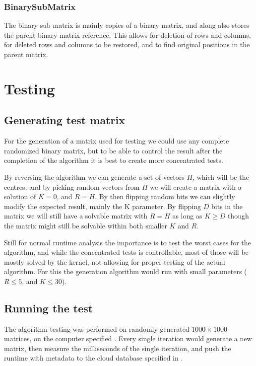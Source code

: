 \documentclass[a4paper]{article}
\begin{document}
\subsubsection{BinarySubMatrix}
The binary sub matrix is mainly copies of a binary matrix, and along also stores the parent
binary matrix reference. This allows for deletion of rows and columns, for deleted rows and
columns to be restored, and to find original positions in the parent matrix.

%
%
\newpage

\section{Testing}
\subsection{Generating test matrix}
For the generation of a matrix used for testing we could use any complete randomized binary
matrix, but to be able to control the result after the completion of the algorithm it is best
to create more concentrated tests.



By reversing the algorithm we can generate a set of vectors $H$, which will be the centres,
and by picking random vectors from $H$ we will create a matrix with a solution of $K=0$,
and $R=H$. By then flipping random bits we can slightly modify the expected result, mainly
the K parameter. By flipping $D$ bits in the matrix we will still have a solvable matrix
with $R = H$ as long as $K \geq D$ though the matrix might still be solvable within both
smaller $K$ and $R$.


Still for normal runtime analysis the importance is to test the worst cases for the algorithm,
and while the concentrated tests is controllable, most of those will be mostly solved by the
kernel, not allowing for proper testing of the actual algorithm. For this the generation
algorithm would run with small parameters ($R \leq 5$, and $K \leq 30$).

\subsection{Running the test}
The algorithm testing was performed on randomly generated $1000 \times 1000$ matrices, on the computer
specified . Every single iteration would generate a new matrix, then measure the
milliseconds of the single iteration, and push the runtime with metadata to the cloud database specified
in .
\end{document}

